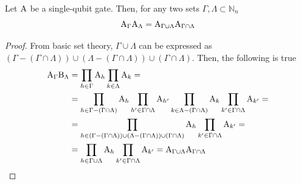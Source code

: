 \documentclass[sigconf,natbib=false]{acmart}
\begin{document}
	\begin{proposition}
		Let $\text{A}$ be a single-qubit gate.
		Then, for any two sets $\Gamma, \Lambda \subset \mathbb{N}_n$
		\begin{equation}
			\label{eq:junta-puertas}
			\text{A}_\Gamma\text{A}_{\Lambda} = \text{A}_{\Gamma\cup\Lambda}\text{A}_{\Gamma\cap\Lambda}
		\end{equation}
		
	\end{proposition}
	\begin{proof}
		From basic set theory, $\Gamma\cup\Lambda$ can be expressed as $(\Gamma-(\Gamma\cap\Lambda))\cup(\Lambda-(\Gamma\cap\Lambda))\cup(\Gamma\cap\Lambda)$. Then, the following is true
		\begin{align*}
			\text{A}_{\Gamma}\text{B}_{\Lambda}&=\prod_{h\in\Gamma}\text{A}_{h}\prod_{k\in\Lambda}\text{A}_{k}=\\
			&=\prod_{h\in\Gamma-(\Gamma\cap\Lambda)}\text{A}_{h}\prod_{h^\prime\in\Gamma\cap\Lambda}\text{A}_{h^\prime}\prod_{k\in\Lambda-(\Gamma\cap\Lambda)}\text{A}_{k}\prod_{k^\prime\in\Gamma\cap\Lambda}\text{A}_{k^\prime}=\\
			&=\prod_{h\in(\Gamma-(\Gamma\cap\Lambda))\cup(\Lambda-(\Gamma\cap\Lambda))\cup(\Gamma\cap\Lambda)}\text{A}_{h}\prod_{k^\prime\in\Gamma\cap\Lambda}\text{A}_{k^\prime}=\\
			&=\prod_{h\in\Gamma\cup\Lambda}\text{A}_{h}\prod_{k^\prime\in\Gamma\cap\Lambda}\text{A}_{k^\prime}=\text{A}_{\Gamma\cup\Lambda}\text{A}_{\Gamma\cap\Lambda}
		\end{align*}
	\end{proof}
\end{document}
